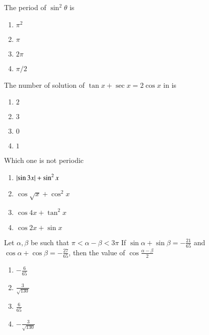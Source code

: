 \iffalse
\title{Trignometric Functions and Equations}
\author{EE24BTECH11007- ARNAV MAKARAND YADNOPAVIT}
\section{mains}
\fi
\item The period of $\sin^2 \theta$ is\hfill{} 
\begin{multicols}{4}
\begin{enumerate}
\item $\pi^2$
\columnbreak
\item $\pi$
\columnbreak
\item $2\pi$
\columnbreak
\item $\pi/2$
\end{enumerate}
\end{multicols}
\item The number of solution of $\tan x + \sec x=2\cos x$ in  is\hfill{} 
\begin{multicols}{4}
\begin{enumerate}
\item $2$
\columnbreak
\item $3$
\columnbreak
\item $0$
\columnbreak
\item $1$
\end{enumerate}
\end{multicols}
\item Which one is not periodic \hfill{}
\begin{multicols}{2} 
\begin{enumerate}
\item $\left\vert\sin3x\right\vert+\sin^2 x$
\item $\cos\sqrt{x}+\cos^2 x$
\columnbreak
\item $\cos4x+\tan^2 x$
\item $\cos2x+\sin x$
\end{enumerate}
\end{multicols}
\item Let $\alpha,\beta$ be such that $\pi<\alpha-\beta<3\pi$
If $\sin\alpha+\sin\beta=-\frac{21}{65}$ and $\cos\alpha+\cos\beta=-\frac{27}{65}$, then the value of $\cos\frac{\alpha-\beta}{2}$\hfill{}
\begin{multicols}{2} 
\begin{enumerate}
\item $-\frac{6}{65}$
\item $\frac{3}{\sqrt{130}}$
\columnbreak
\item $\frac{6}{65}$
\item $-\frac{3}{\sqrt{130}}$
\end{enumerate} 
\end{multicols}
